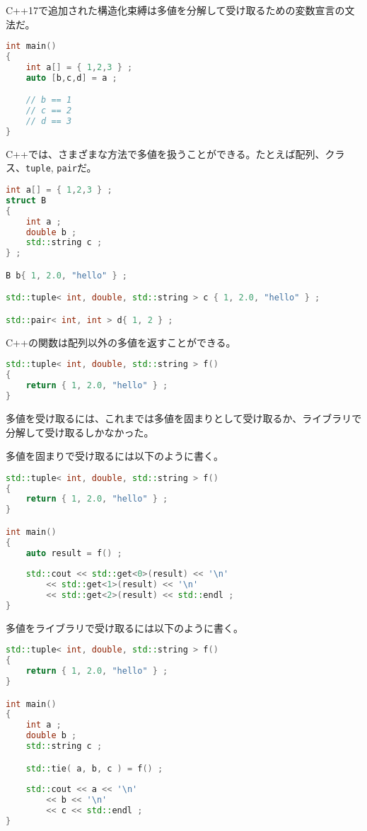 %

C++17で追加された構造化束縛は多値を分解して受け取るための変数宣言の文法だ。

\begin{lstlisting}[language=C++]
int main()
{
    int a[] = { 1,2,3 } ;
    auto [b,c,d] = a ;

    // b == 1
    // c == 2
    // d == 3
}
\end{lstlisting}

C++では、さまざまな方法で多値を扱うことができる。たとえば配列、クラス、\lstinline!tuple!,
\lstinline!pair!だ。

\begin{lstlisting}[language=C++]
int a[] = { 1,2,3 } ;
struct B
{
    int a ;
    double b ;
    std::string c ;
} ;

B b{ 1, 2.0, "hello" } ;

std::tuple< int, double, std::string > c { 1, 2.0, "hello" } ;

std::pair< int, int > d{ 1, 2 } ;
\end{lstlisting}

C++の関数は配列以外の多値を返すことができる。

\begin{lstlisting}[language=C++]
std::tuple< int, double, std::string > f()
{
    return { 1, 2.0, "hello" } ;
}
\end{lstlisting}

多値を受け取るには、これまでは多値を固まりとして受け取るか、ライブラリで分解して受け取るしかなかった。

多値を固まりで受け取るには以下のように書く。

\begin{lstlisting}[language=C++]
std::tuple< int, double, std::string > f()
{
    return { 1, 2.0, "hello" } ;
}

int main()
{
    auto result = f() ;
    
    std::cout << std::get<0>(result) << '\n' 
        << std::get<1>(result) << '\n'
        << std::get<2>(result) << std::endl ;
}
\end{lstlisting}

多値をライブラリで受け取るには以下のように書く。

\begin{lstlisting}[language=C++]
std::tuple< int, double, std::string > f()
{
    return { 1, 2.0, "hello" } ;
}

int main()
{
    int a ;
    double b ;
    std::string c ;

    std::tie( a, b, c ) = f() ;
    
    std::cout << a << '\n' 
        << b << '\n'
        << c << std::endl ;
}
\end{lstlisting}

